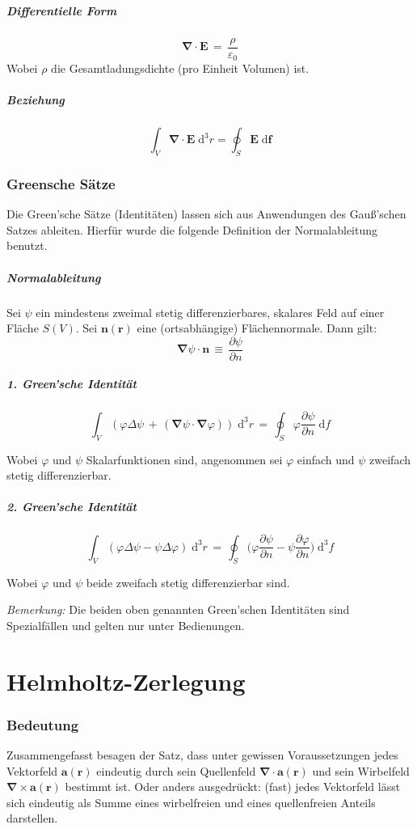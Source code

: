\documentclass[titlepage,11pt,a4paper,ngerman]{report}
\renewcommand{\vec}[1]{\boldsymbol{#1}}
\renewcommand{\epsilon}{\varepsilon}
\newcommand{\vabla}{\boldsymbol{\nabla}}
\renewcommand{\paragraph}[1]{\subsubsection{#1}}
\begin{document}
\subparagraph{Differentielle Form}
\[\vec{\nabla}\cdot\vec{E}\,=\,\frac{\rho}{\epsilon_0}\]
Wobei $\rho$ die Gesamtladungsdichte (pro Einheit Volumen) ist.

\subparagraph{Beziehung}
$$\int_{V} \vabla \cdot \vec{E}\;\mathrm{d}^{3}r = \oint_{S}\vec{E}\;\mathrm{d}\vec{f}$$
\hfill \break

\paragraph{Greensche Sätze}
Die Green’sche Sätze (Identitäten) lassen sich aus Anwendungen des Gauß’schen Satzes ableiten. Hierfür wurde die folgende Definition der Normalableitung benutzt.

\subparagraph{Normalableitung} \hfill \break
Sei $\psi$ ein mindestens zweimal stetig differenzierbares, skalares Feld auf einer Fläche $S(V)$. Sei $\vec{n}(\vec{r})$ eine (ortsabhängige) Flächennormale. Dann gilt:
\[\vec{\nabla}\psi\cdot\vec{n}\,\equiv\,\frac{\partial\psi}{\partial n}\]

\subparagraph{1. Green'sche Identität}
\[\int_V(\varphi\Delta\psi\,+\,(\vabla\psi\cdot\vabla\varphi))\;\mathrm{d}^3r\,=\,\oint_{S}\varphi\frac{\partial\psi}{\partial n}\;\mathrm{d}f\]

Wobei $\varphi$ und $\psi$ Skalarfunktionen sind, angenommen sei $\varphi$ einfach und $\psi$ zweifach stetig differenzierbar.

\subparagraph{2. Green'sche Identität}
\[\int_V (\varphi\Delta\psi-\psi\Delta\varphi)\;\mathrm{d}^3r\,=\,\oint_{S}\bigg(\varphi\frac{\partial\psi}{\partial n}-\psi\frac{\partial\varphi}{\partial n}\bigg)\;\mathrm{d}^3f\]

Wobei $\varphi$ und $\psi$ beide zweifach stetig differenzierbar sind.

\bigskip
\emph{Bemerkung:} Die beiden oben genannten Green'schen Identitäten sind Spezialfällen und gelten nur unter Bedienungen.

\section{Helmholtz-Zerlegung}
\paragraph{Bedeutung}
Zusammengefasst besagen der Satz, dass unter gewissen Voraussetzungen jedes Vektorfeld $\vec{a}(\vec{r})$ eindeutig durch sein Quellenfeld $\vabla\cdot\vec{a}(\vec{r})$ und sein Wirbelfeld $\vabla\times\vec{a}(\vec{r})$ bestimmt ist. Oder anders ausgedrückt: (fast) jedes Vektorfeld lässt sich eindeutig als Summe eines wirbelfreien und eines quellenfreien Anteils darstellen.
\end{document}
